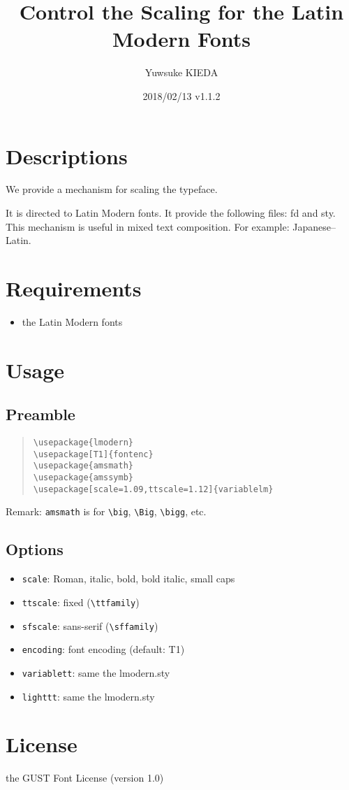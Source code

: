 \documentclass{article}
\title{Control the Scaling for the Latin Modern Fonts}
\author{Yuwsuke KIEDA}
\date{2018/02/13 v1.1.2}
\begin{document}
\maketitle

\section{Descriptions}

We provide a mechanism for scaling the typeface.

It is directed to Latin Modern fonts.
It provide the following files: fd and sty.
This mechanism is useful in mixed text composition.
For example: Japanese--Latin.

\section{Requirements}

\begin{itemize}
 \item the Latin Modern fonts
\end{itemize}

\section{Usage}

\subsection{Preamble}

\begin{quote}
\begin{verbatim}
\usepackage{lmodern}
\usepackage[T1]{fontenc}
\usepackage{amsmath}
\usepackage{amssymb}
\usepackage[scale=1.09,ttscale=1.12]{variablelm}
\end{verbatim}
\end{quote}

Remark: \texttt{amsmath} is for \verb!\big!, \verb!\Big!, \verb!\bigg!, etc.

\subsection{Options}

\begin{itemize}
 \item [\textendash] \texttt{scale}: Roman, italic, bold, bold italic, small caps
 \item [\textendash] \texttt{ttscale}: fixed (\verb!\ttfamily!)
 \item [\textendash] \texttt{sfscale}: sans-serif (\verb!\sffamily!)
 \item [\textendash] \texttt{encoding}: font encoding (default: T1)
 \item [\textendash] \texttt{variablett}: same the lmodern.sty
 \item [\textendash] \texttt{lighttt}: same the lmodern.sty
\end{itemize}


\section{License}

the GUST Font License (version 1.0)
\end{document}
